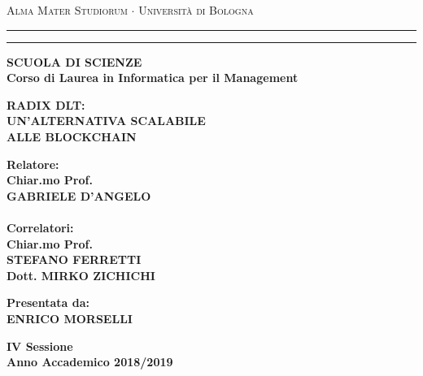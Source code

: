 \documentclass[12pt,a4paper]{report}
\begin{document}
\begin{titlepage}
\begin{center}
{{\Large{\textsc{Alma Mater Studiorum $\cdot$ Universit\`a di
Bologna}}}} \rule[0.1cm]{15.8cm}{0.1mm}
\rule[0.5cm]{15.8cm}{0.6mm}
{\small{\bf SCUOLA DI SCIENZE\\
Corso di Laurea in Informatica per il Management }}
\end{center}
\vspace{15mm}
\begin{center}
{\LARGE{\bf RADIX DLT:}}\\
\vspace{3mm}
{\LARGE{\bf UN'ALTERNATIVA SCALABILE}}\\
\vspace{3mm}
{\LARGE{\bf ALLE BLOCKCHAIN}}\\
\end{center}
\vspace{40mm}
\par
\noindent
\begin{minipage}[t]{0.47\textwidth}
{\large{\bf Relatore:\\
Chiar.mo Prof.\\
GABRIELE D'ANGELO \\}}
{\large{\bf \\ Correlatori: \\
Chiar.mo Prof. \\
STEFANO FERRETTI \\
Dott. MIRKO ZICHICHI}}
\end{minipage}
\hfill
\begin{minipage}[t]{0.47\textwidth}\raggedleft
{\large{\bf Presentata da:\\
ENRICO MORSELLI}}
\end{minipage}
\vspace{20mm}
\begin{center}
{\large{\bf IV Sessione\\%
Anno Accademico 2018/2019}}%
\end{center}
\end{titlepage}
\end{document}
